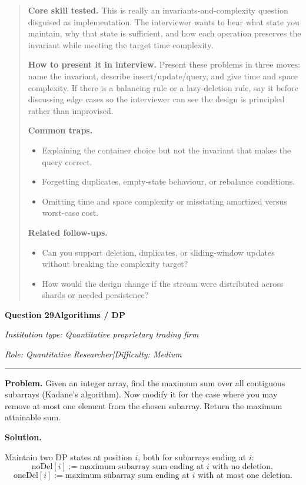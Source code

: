 \documentclass[11pt,letterpaper,openany]{book}
\newenvironment{EditorialNote}
  {\begin{quote}\small\setlength{\parskip}{0.25em}}
  {\end{quote}}
\newcommand{\QuestionSpacer}{\vspace{0.4em}}
\newcommand{\InterviewQuestionHeader}[5]{%
  \vspace{1.0em}%
  {\large\bfseries #1\enspace #4\par}%
  {\small\itshape Institution type: #2\par}%
  {\small\itshape Role: #3\enspace |\enspace Difficulty: #5\par}%
  \vspace{0.25em}\hrule\vspace{0.45em}%
}
\begin{document}
\begin{EditorialNote}


\textbf{Core skill tested.} This is really an invariants-and-complexity question disguised as implementation. The interviewer wants to hear what state you maintain, why that state is sufficient, and how each operation preserves the invariant while meeting the target time complexity.

\textbf{How to present it in interview.} Present these problems in three moves: name the invariant, describe insert/update/query, and give time and space complexity. If there is a balancing rule or a lazy-deletion rule, say it before discussing edge cases so the interviewer can see the design is principled rather than improvised.

\textbf{Common traps.}
\begin{itemize}
\item Explaining the container choice but not the invariant that makes the query correct.
\item Forgetting duplicates, empty-state behaviour, or rebalance conditions.
\item Omitting time and space complexity or misstating amortized versus worst-case cost.
\end{itemize}

\textbf{Related follow-ups.}
\begin{itemize}
\item Can you support deletion, duplicates, or sliding-window updates without breaking the complexity target?
\item How would the design change if the stream were distributed across shards or needed persistence?
\end{itemize}


\end{EditorialNote}
\QuestionSpacer

\InterviewQuestionHeader{Question 29}{Quantitative proprietary trading firm}{Quantitative Researcher}{Algorithms / DP}{Medium}
\textbf{Problem.} Given an integer array, find the maximum sum over all contiguous subarrays (Kadane's algorithm). Now modify it for the case where you may remove at most one element from the chosen subarray. Return the maximum attainable sum.

\textbf{Solution.}

Maintain two DP states at position \(i\), both for subarrays ending at \(i\):
\[
\mathrm{noDel}[i]
:= \text{maximum subarray sum ending at } i \text{ with no deletion},
\]
\[
\mathrm{oneDel}[i]
:= \text{maximum subarray sum ending at } i \text{ with at most one deletion}.
\]
\end{document}

